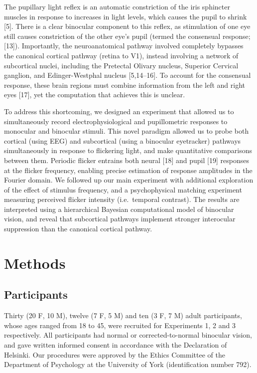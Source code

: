 \documentclass[
]{article}
\begin{document}
The pupillary light reflex is an automatic constriction of the iris sphincter muscles in response to increases in light levels, which causes the pupil to shrink {[}5{]}. There is a clear binocular component to this reflex, as stimulation of one eye still causes constriction of the other eye's pupil (termed the consensual response; {[}13{]}). Importantly, the neuroanatomical pathway involved completely bypasses the canonical cortical pathway (retina to V1), instead involving a network of subcortical nuclei, including the Pretectal Olivary nucleus, Superior Cervical ganglion, and Edinger-Westphal nucleus {[}5,14--16{]}. To account for the consensual response, these brain regions must combine information from the left and right eyes {[}17{]}, yet the computation that achieves this is unclear.

To address this shortcoming, we designed an experiment that allowed us to simultaneously record electrophysiological and pupillometric responses to monocular and binocular stimuli. This novel paradigm allowed us to probe both cortical (using EEG) and subcortical (using a binocular eyetracker) pathways simultaneously in response to flickering light, and make quantitative comparisons between them. Periodic flicker entrains both neural {[}18{]} and pupil {[}19{]} responses at the flicker frequency, enabling precise estimation of response amplitudes in the Fourier domain. We followed up our main experiment with additional exploration of the effect of stimulus frequency, and a psychophysical matching experiment measuring perceived flicker intensity (i.e.~temporal contrast). The results are interpreted using a hierarchical Bayesian computational model of binocular vision, and reveal that subcortical pathways implement stronger interocular suppression than the canonical cortical pathway.

\hypertarget{methods}{%
\section{Methods}\label{methods}}

\hypertarget{participants}{%
\subsection{Participants}\label{participants}}

Thirty (20 F, 10 M), twelve (7 F, 5 M) and ten (3 F, 7 M) adult participants, whose ages ranged from 18 to 45, were recruited for Experiments 1, 2 and 3 respectively. All participants had normal or corrected-to-normal binocular vision, and gave written informed consent in accordance with the Declaration of Helsinki. Our procedures were approved by the Ethics Committee of the Department of Psychology at the University of York (identification number 792).
\end{document}
